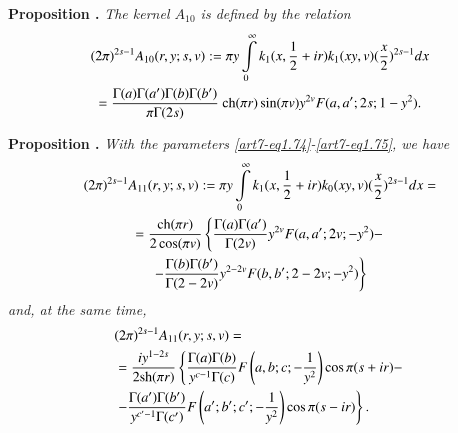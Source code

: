 \medskip
\noindent
{\bfseries Proposition .\label{art7-prop3}}
\textit{The kernel $A_{10}$ is defined by the relation}
\begin{gather}
(2\pi)^{2s-1} A_{10} (r,y;s,v) : = \pi y \int\limits^\infty_0 k_1 (x, \frac{1}{2} + ir) k_1 (xy, v) (\frac{x}{2})^{2s-1} dx\label{art7-eq1.80}\\
=\frac{\Gamma (a) \Gamma (a') \Gamma (b) \Gamma (b')}{\pi \Gamma (2s)} \text{ ch} (\pi r) \sin (\pi v) y^{2v} F (a, a'; 2s; 1-y^2).  \notag
\end{gather}

\medskip
\noindent
{\bfseries Proposition .\label{art7-prop4}} 
\textit{With the parameters \eqref{art7-eq1.74}-\eqref{art7-eq1.75}, we have}
\begin{gather}
(2\pi)^{2s-1} A_{11} (r,y;s,v) : = \pi y \int\limits^\infty_0 k_1 (x, \frac{1}{2} + ir) k_0 (xy,v) (\frac{x}{2})^{2s-1} dx =\notag\\
= \frac{\text{ch} (\pi r)}{2\cos (\pi v)} \left\{\frac{\Gamma (a) \Gamma (a')}{\Gamma (2v)} y^{2v} F(a, a'; 2v; -y^2) - \right. \notag\\
\left. -\frac{\Gamma (b) \Gamma (b')}{\Gamma (2-2v)} y^{2-2v} F(b,b'; 2 -2 v; -y^2)  \right\} \label{art7-eq1.81}
\end{gather}
\textit{and, at the same time,}
\begin{align}
& (2\pi)^{2s-1} A_{11} (r, y; s, v) = \label{art7-eq1.82}\\
& = \frac{iy^{1-2s}}{2\text{sh}(\pi r)} \left\{\frac{\Gamma (a) \Gamma (b)}{y^{c-1} \Gamma (c)} F \left(a, b; c; - \frac{1}{y^2} \right) \cos \pi(s+ir) - \right. \notag\\
& \left. -\frac{\Gamma (a') \Gamma (b')}{ y^{c'-1} \Gamma (c')} F \left(a'; b'; c'; - \frac{1}{y^2} \right) \cos \pi (s-ir)  \right\}. \notag
\end{align}


